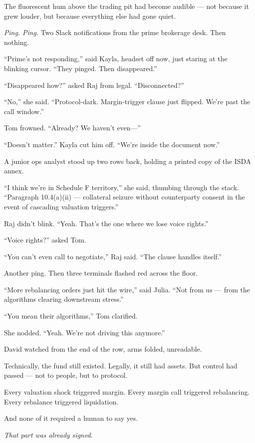 The fluorescent hum above the trading pit had become audible — not because it grew louder, but because everything else had gone quiet.

\textit{Ping. Ping.}
Two Slack notifications from the prime brokerage desk.
Then nothing.

“Prime’s not responding,” said Kayla, headset off now, just staring at the blinking cursor. “They pinged. Then disappeared.”

“Disappeared how?” asked Raj from legal. “Disconnected?”

“No,” she said. “Protocol-dark. Margin-trigger clause just flipped. We’re past the call window.”

Tom frowned. “Already? We haven’t even—”

“Doesn’t matter.” Kayla cut him off. “We're inside the document now.”

A junior ops analyst stood up two rows back, holding a printed copy of the ISDA annex.

“I think we’re in Schedule F territory,” she said, thumbing through the stack. “Paragraph 10.4(a)(ii) — collateral seizure without counterparty consent in the event of cascading valuation triggers.”

Raj didn’t blink. “Yeah. That’s the one where we lose voice rights.”

“Voice rights?” asked Tom.

“You can’t even call to negotiate,” Raj said. “The clause handles itself.”

Another ping.
Then three terminals flashed red across the floor.

“More rebalancing orders just hit the wire,” said Julia. “Not from us — from the algorithms clearing downstream stress.”

“You mean their algorithms,” Tom clarified.

She nodded. “Yeah. We’re not driving this anymore.”

David watched from the end of the row, arms folded, unreadable.

Technically, the fund still existed.
Legally, it still had assets.
But control had passed — not to people, but to protocol.

Every valuation shock triggered margin.
Every margin call triggered rebalancing.
Every rebalance triggered liquidation.

And none of it required a human to say yes.

\textit{That part was already signed.}

